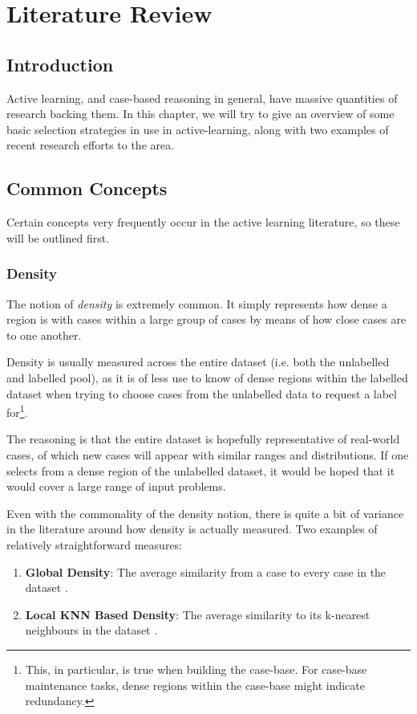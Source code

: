 \documentclass[a4paper,11pt]{report}
\begin{document}
\chapter{Literature Review\label{cha:litreview}}
\section{Introduction}
Active learning, and case-based reasoning in general, have massive quantities of research backing them. In this chapter, we will try to give an overview of some basic selection strategies in use in active-learning, along with two examples of recent research efforts to the area.

\section{Common Concepts}
Certain concepts very frequently occur in the active learning literature, so these will be outlined first.

\subsection{Density}
The notion of \emph{density} is extremely common. It simply represents how dense a region is with cases within a large group of cases by means of how close cases are to one another.

Density is usually measured across the entire dataset (i.e. both the unlabelled and labelled pool), as it is of less use to know of dense regions within the labelled dataset when trying to choose cases from the unlabelled data to request a label for\footnote{This, in particular, is true when building the case-base. For case-base maintenance tasks, dense regions within the case-base might indicate redundancy.}. 

The reasoning is that the entire dataset is hopefully representative of real-world cases, of which new cases will appear with similar ranges and distributions. If one selects from a dense region of the unlabelled dataset, it would be hoped that it would cover a large range of input problems.

\begin{samepage}
Even with the commonality of the density notion, there is quite a bit of variance in the literature around how density is actually measured. Two examples of relatively straightforward measures:
\begin{enumerate}
	\item \textbf{Global Density}: The average similarity from a case to every case in the dataset \citep{Xu2007}.
	\item \textbf{Local KNN Based Density}: The average similarity to its k-nearest neighbours in the dataset \citep{Zhu2008}.
\end{enumerate}
\end{samepage}
\end{document}
